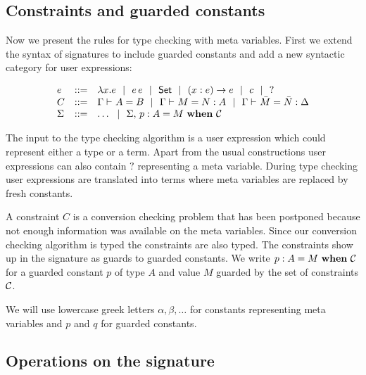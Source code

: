 \subsection{Constraints and guarded constants}

Now we present the rules for type checking with meta variables. First we extend
the syntax of signatures to include guarded constants and add a new syntactic
category for user expressions:

\[\begin{array}{lcll}
    e & ::= & \lambda x.{}e ~~|~~ e\,e ~~|~~ \mathsf{Set} ~~|~~ (x:e)\to{}e ~~|~~ c ~~|~~ ? \\
    C & ::= & {\Gamma} \vdash_{}A=B ~~|~~ {\Gamma} \vdash_{}M=N:A ~~|~~
	      {\Gamma} \vdash_{}\bar M=\bar N:\Delta \\
    \Sigma & ::= & \ldots ~~|~~
		{\Sigma},\,{} {p} : {A} = {M} ~\mathbf{when}~ {\mathcal{C}} \\
\end{array}\]

The input to the type checking algorithm is a user expression which could
represent either a type or a term. Apart from the usual constructions user
expressions can also contain $?$ representing a meta variable. During type
checking user expressions are translated into {\Core} terms where meta
variables are replaced by fresh constants.

A constraint $C$ is a conversion checking problem that has been postponed
because not enough information was available on the meta variables. Since our
conversion checking algorithm is typed the constraints are also typed. The
constraints show up in the signature as guards to guarded constants. We write
${p} : {A} = {M} ~\mathbf{when}~ {\mathcal{C}}$ for a guarded constant $p$ of type $A$ and value $M$
guarded by the set of constraints $\mathcal{C}$.

We will use lowercase greek letters $\alpha, \beta, \ldots$ for constants
representing meta variables and $p$ and $q$ for guarded constants.

\subsection{Operations on the signature}

